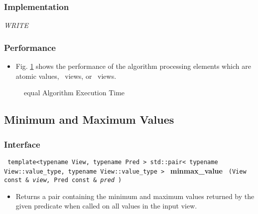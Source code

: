 \subsubsection{Implementation} %

\textit{WRITE}

\subsubsection{Performance} %

\begin{itemize}
\item
Fig. \ref{fig:equal-alg-exec-exper}
shows the performance of the algorithm processing
elements which are atomic values, \stl\ views, or \stapl\ views.
\end{itemize}

\begin{figure}[p]
\caption{equal Algorithm Execution Time}
\label{fig:equal-alg-exec-exper}
\end{figure}



\subsection{Minimum and Maximum Values} \label{sec-sumry-minmax}

\subsubsection{Interface} %

\noindent
\texttt{%
template<typename View, typename Pred >
\newline
std::pair< typename View::value\_type, typename View::value\_type > 
}
\newline
\textbf{minmax\_value}%
\texttt{%
(View const \&
\textit{view,}%
Pred const \&
\textit{pred}%
)
}

\begin{itemize}
\item
Returns a pair containing the minimum and maximum values returned by the given predicate when called on all values in the input view. 
\end{itemize}
 
